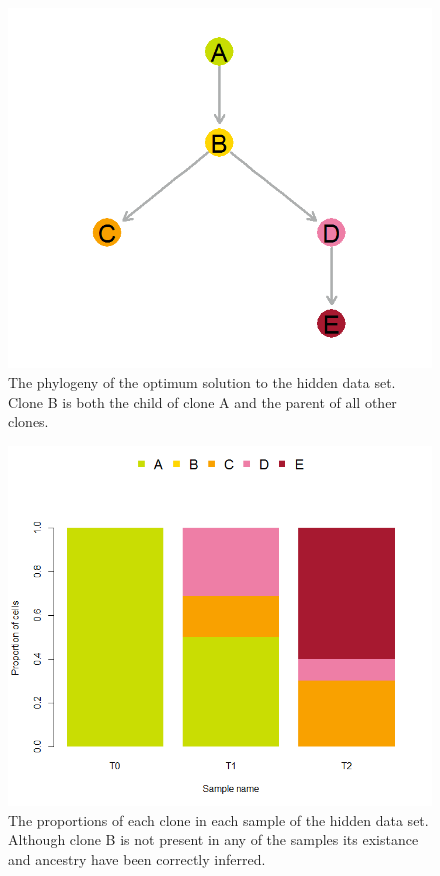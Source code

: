 \documentclass{article}
\begin{document}
\begin{figure}[H]
    \centering
    \includegraphics{gaga_hidden_data_phylogeny.png}
    \caption{The phylogeny of the optimum solution to the hidden data set.  Clone B is both the child of clone A and the parent of all other clones.}
\end{figure}

\begin{figure}[H]
   \centering
       \includegraphics{gaga_hidden_data_proportions}
   \caption{The proportions of each clone in each sample of the hidden data set.  Although clone B is not present in any of the samples its existance and ancestry have been correctly inferred.}
\end{figure}
\end{document}

